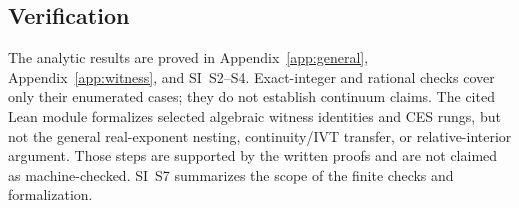 \subsection{Verification}\label{sec:verification}

The analytic results are proved in Appendix~\ref{app:general}, Appendix~\ref{app:witness}, and SI~S2--S4. Exact-integer and rational checks cover only their enumerated cases; they do not establish continuum claims. The cited Lean module formalizes selected algebraic witness identities and CES rungs, but not the general real-exponent nesting, continuity/IVT transfer, or relative-interior argument. Those steps are supported by the written proofs and are not claimed as machine-checked. SI~S7 summarizes the scope of the finite checks and formalization.
